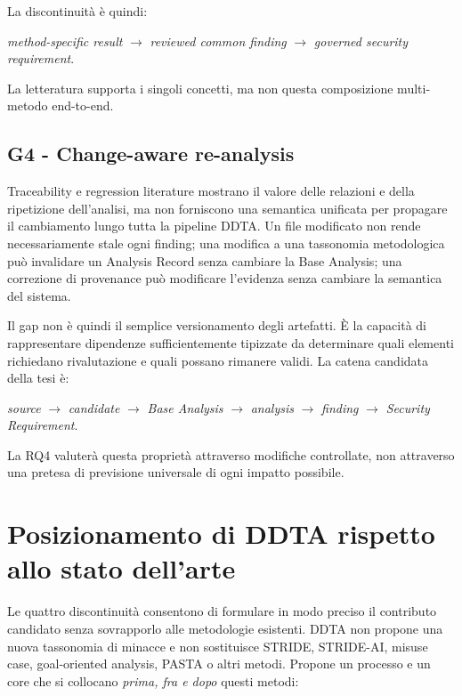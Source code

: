 \documentclass[12pt,a4paper,oneside]{report}
\begin{document}
La discontinuità è quindi:

\begin{center}
\textit{method-specific result} $\rightarrow$ \textit{reviewed common finding} $\rightarrow$ \textit{governed security requirement}.
\end{center}

La letteratura supporta i singoli concetti, ma non questa composizione multi-metodo end-to-end.

\subsection{G4 - Change-aware re-analysis}

Traceability e regression literature mostrano il valore delle relazioni e della ripetizione dell'analisi, ma non forniscono una semantica unificata per propagare il cambiamento lungo tutta la pipeline DDTA. Un file modificato non rende necessariamente stale ogni finding; una modifica a una tassonomia metodologica può invalidare un Analysis Record senza cambiare la Base Analysis; una correzione di provenance può modificare l'evidenza senza cambiare la semantica del sistema.

Il gap non è quindi il semplice versionamento degli artefatti. È la capacità di rappresentare dipendenze sufficientemente tipizzate da determinare quali elementi richiedano rivalutazione e quali possano rimanere validi. La catena candidata della tesi è:

\begin{center}
\textit{source} $\rightarrow$ \textit{candidate} $\rightarrow$ \textit{Base Analysis} $\rightarrow$ \textit{analysis} $\rightarrow$ \textit{finding} $\rightarrow$ \textit{Security Requirement}.
\end{center}

La RQ4 valuterà questa proprietà attraverso modifiche controllate, non attraverso una pretesa di previsione universale di ogni impatto possibile.

\section{Posizionamento di DDTA rispetto allo stato dell'arte}

Le quattro discontinuità consentono di formulare in modo preciso il contributo candidato senza sovrapporlo alle metodologie esistenti. DDTA non propone una nuova tassonomia di minacce e non sostituisce STRIDE, STRIDE-AI, misuse case, goal-oriented analysis, PASTA o altri metodi. Propone un processo e un core che si collocano \emph{prima, fra e dopo} questi metodi:
\end{document}
